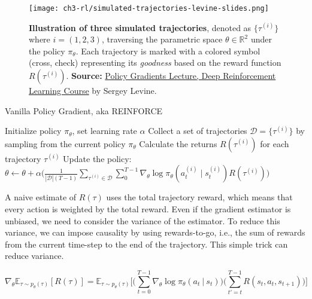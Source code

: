 \begin{figure}[ht]
    \centering
    \texttt{[image: ch3-rl/simulated-trajectories-levine-slides.png]}
    \captionsetup{width=\textwidth} %
    \caption{\textbf{Illustration of three simulated trajectories}, denoted as $\{\tau^{(i)}\}$ where $i=(1,2,3)$, traversing the parametric space $\theta\in\mathbb{R}^2$ under the policy $\pi_{\theta}$. Each trajectory is marked with a colored symbol (cross, check) representing its \textit{goodness} based on the reward function $R(\tau^{(i)})$. \textbf{Source:} \href{https://rail.eecs.berkeley.edu/deeprlcourse/}{Policy Gradients Lecture, Deep Reinforcement Learning Course} by Sergey Levine.}
    \label{fig:anatomy-rl-trajectories}
  \end{figure}
  
\begin{algorithm}
    \caption{Vanilla Policy Gradient, aka REINFORCE}
    \begin{algorithmic}
    \STATE Initialize policy $\pi_{\theta}$, set learning rate $\alpha$
        \STATE Collect a set of trajectories $\mathcal{D}=\{\tau^{(i)}\}$ by sampling from the current policy $\pi_{\theta}$
        \STATE Calculate the returns $R(\tau^{(i)})$ for each trajectory $\tau^{(i)}$
        \STATE Update the policy: $\theta \leftarrow \theta + \alpha \bigg(\frac{1}{|\mathcal{D}|(T-1)}\sum_{\tau^{(i)}\in\mathcal{D}}\sum_{0}^{T-1}\nabla_{\theta}\log\pi_{\theta}(a_{t}^{(i)}\mid s_{t}^{(i)})R(\tau^{(i)})\bigg)$
    \ENDFOR
    \end{algorithmic}
\end{algorithm}

\noindent {} A naive estimate of $R(\tau)$ uses the total trajectory reward, which means that every action is weighted by the total reward. Even if the gradient estimator is unbiased, we need to consider the variance of the estimator.
To reduce this variance, we can impose causality by using rewards-to-go, i.e., the sum of rewards from the current time-step to the end of the trajectory. This simple trick can reduce variance. 

\begin{equation}\label{eqn:reinforce-gradient-reward-to-go}
    \nabla_{\theta}\mathbb{E}_{\tau\sim p_{\theta}(\tau)}[R(\tau)] = \mathbb{E}_{\tau\sim p_{\theta}(\tau)}\bigg[\bigg(\sum_{t=0}^{T-1} \nabla_{\theta}\log \pi_{\theta} (a_t~|~s_t)\bigg) \bigg(\sum_{t'=t}^{T-1}R(s_{t}, a_{t}, s_{t+1})\bigg)\bigg] 
\end{equation}

